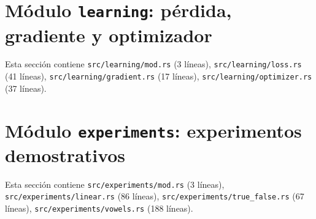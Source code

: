 \section{Módulo \texttt{learning}: pérdida, gradiente y optimizador}
Esta sección contiene \texttt{src/learning/mod.rs} (3 líneas), \texttt{src/learning/loss.rs} (41 líneas), \texttt{src/learning/gradient.rs} (17 líneas), \texttt{src/learning/optimizer.rs} (37 líneas).
\section{Módulo \texttt{experiments}: experimentos demostrativos}
Esta sección contiene \texttt{src/experiments/mod.rs} (3 líneas), \texttt{src/experiments/linear.rs} (86 líneas), \texttt{src/experiments/true\_false.rs} (67 líneas), \texttt{src/experiments/vowels.rs} (188 líneas).

